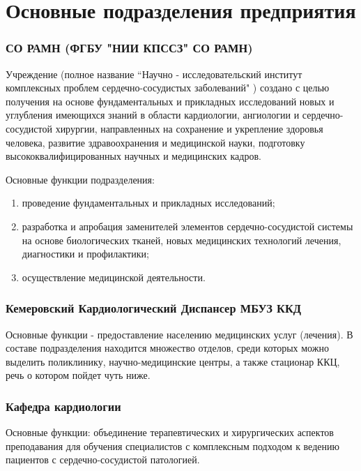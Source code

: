 \section{Основные подразделения предприятия}

\subsubsection{СО РАМН (ФГБУ "НИИ КПССЗ" СО РАМН)}
Учреждение (полное название “Научно - исследовательский институт комплексных
проблем сердечно-сосудистых заболеваний" ) создано с целью получения на основе
фундаментальных и прикладных исследований новых и углубления имеющихся знаний в
области  кардиологии, ангиологии и сердечно-сосудистой хирургии, направленных на
сохранение и укрепление здоровья человека, развитие здравоохранения и
медицинской науки, подготовку высококвалифицированных научных и медицинских
кадров.

Основные функции подразделения:
\begin{enumerate}
	\item проведение фундаментальных и прикладных исследований;
	\item разработка и апробация заменителей элементов сердечно-сосудистой системы
на основе биологических тканей, новых медицинских технологий лечения, 
диагностики и профилактики;
	\item осуществление медицинской деятельности.
\end{enumerate}

\subsubsection{Кемеровский Кардиологический Диспансер МБУЗ ККД}
Основные функции - предоставление населению медицинских услуг (лечения). В
составе подразделения находится множество отделов, среди которых можно выделить
поликлинику, научно-медицинские центры, а также стационар ККЦ, речь о котором
пойдет чуть ниже.

\subsubsection{Кафедра кардиологии}
Основные функции:  объединение терапевтических и хирургических аспектов
преподавания для обучения специалистов с комплексным подходом к ведению
пациентов с сердечно-сосудистой патологией.
